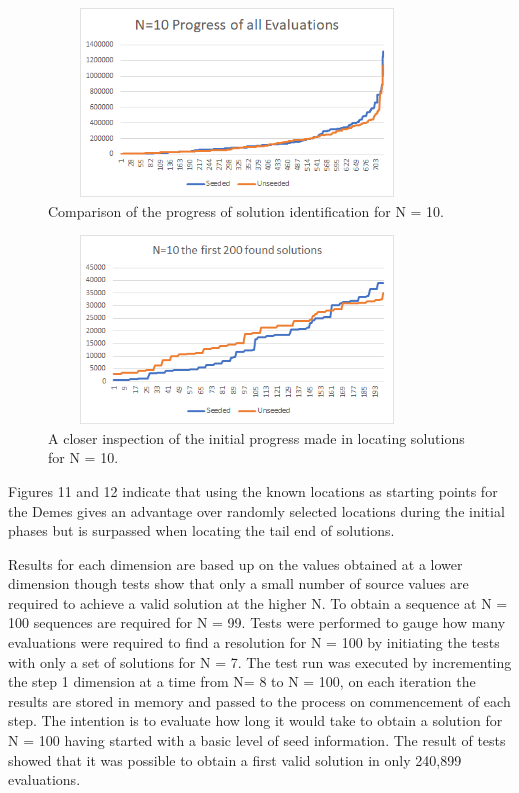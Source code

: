 \documentclass[a4paper,onecolumn,11pt]{article}
\begin{document}
\begin{figure}[!htbp]
	\centering	
	\includegraphics[width=10cm, height=5cm]{N10AllEvaluations}
	\caption{Comparison of the progress of solution identification for N = 10.}
\end{figure}

\begin{figure}[!htbp]
	\centering	
	\includegraphics[width=10cm, height=5cm]{First200Progress}
	\caption{A closer inspection of the initial progress made in locating solutions for N = 10.}
\end{figure}

Figures 11 and 12 indicate that using the known locations as starting points for the Demes gives an advantage over randomly selected locations during the initial phases but is surpassed when locating the tail end of solutions. 

Results for each dimension are based up on the values obtained at a lower dimension though tests show that only a small number of source values are required to achieve a valid solution at the higher N. To obtain a sequence at N = 100 sequences are required for N = 99. Tests were performed to gauge how many evaluations were required to find a resolution for N = 100 by initiating the tests with only a set of solutions for N = 7. The test run was executed by incrementing the step 1 dimension at a time from N= 8 to N = 100, on each iteration the results are stored in memory and passed to the process on commencement of each step. The intention is to evaluate how long it would take to obtain a solution for N = 100 having started with a basic level of seed information. The result of tests showed that it was possible to obtain a first valid solution in only 240,899 evaluations.
\end{document}
